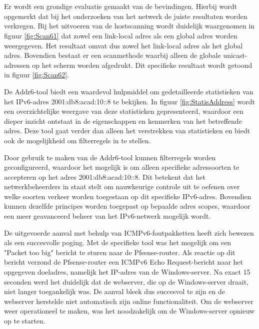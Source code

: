 \chapter{}%
\label{ch:resultaten}

Er wordt een grondige evaluatie gemaakt van de bevindingen. Hierbij wordt opgemerkt dat bij het onderzoeken van het netwerk de juiste resultaten worden verkregen. Bij het uitvoeren van de hostscanning wordt duidelijk waargenomen in figuur \ref{fig:Scan61} dat zowel een link-local adres als een global adres worden weergegeven. Het resultaat omvat dus zowel het link-local adres als het global adres. Bovendien bestaat er een scanmethode waarbij alleen de globale unicast-adressen op het scherm worden afgedrukt. Dit specifieke resultaat wordt getoond in figuur \ref{fig:Scan62}.


\newline

De Addr6-tool biedt een waardevol hulpmiddel om gedetailleerde statistieken van het IPv6-adres 2001:db8:acad:10::8 te bekijken. In figuur \ref{fig:StatisAddress} wordt een overzichtelijke weergave van deze statistieken gepresenteerd, waardoor een dieper inzicht ontstaat in de eigenschappen en kenmerken van het betreffende adres. Deze tool gaat verder dan alleen het verstrekken van statistieken en biedt ook de mogelijkheid om filterregels in te stellen.
\newline

Door gebruik te maken van de Addr6-tool kunnen filterregels worden geconfigureerd, waardoor het mogelijk is om alleen specifieke adressoorten te accepteren op het adres 2001:db8:acad:10::8. Dit betekent dat het netwerkbeheerders in staat stelt om nauwkeurige controle uit te oefenen over welke soorten verkeer worden toegestaan op dit specifieke IPv6-adres. Bovendien kunnen dezelfde principes worden toegepast op bepaalde adres scopes, waardoor een meer geavanceerd beheer van het IPv6-netwerk mogelijk wordt.

\newline

De uitgevoerde aanval met behulp van ICMPv6-foutpakketten heeft zich bewezen als een succesvolle poging. Met de specifieke tool was het mogelijk om een "Packet too big" bericht te sturen naar de Pfsense-router. Als reactie op dit bericht verzond de Pfsense-router een ICMPv6 Echo Request-bericht naar het opgegeven doeladres, namelijk het IP-adres van de Windows-server. Na exact 15 seconden werd het duidelijk dat de webserver, die op de Windows-server draait, niet langer toegankelijk was. De aanval bleek dus succesvol te zijn en de webserver herstelde niet automatisch zijn online functionaliteit. Om de webserver weer operationeel te maken, was het noodzakelijk om de Windows-server opnieuw op te starten.
\newline

